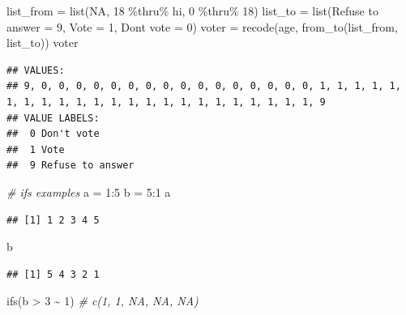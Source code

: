 \documentclass[
]{book}
\newenvironment{Shaded}{\begin{snugshade}}{\end{snugshade}}
\newcommand{\AttributeTok}[1]{\textcolor[rgb]{0.77,0.63,0.00}{#1}}
\newcommand{\CommentTok}[1]{\textcolor[rgb]{0.56,0.35,0.01}{\textit{#1}}}
\newcommand{\ConstantTok}[1]{\textcolor[rgb]{0.00,0.00,0.00}{#1}}
\newcommand{\DecValTok}[1]{\textcolor[rgb]{0.00,0.00,0.81}{#1}}
\newcommand{\FunctionTok}[1]{\textcolor[rgb]{0.00,0.00,0.00}{#1}}
\newcommand{\NormalTok}[1]{#1}
\newcommand{\OtherTok}[1]{\textcolor[rgb]{0.56,0.35,0.01}{#1}}
\newcommand{\SpecialCharTok}[1]{\textcolor[rgb]{0.00,0.00,0.00}{#1}}
\newcommand{\StringTok}[1]{\textcolor[rgb]{0.31,0.60,0.02}{#1}}
\begin{document}
\begin{Shaded}
\begin{Highlighting}[]
\NormalTok{list\_from }\OtherTok{=} \FunctionTok{list}\NormalTok{(}\ConstantTok{NA}\NormalTok{, }\DecValTok{18} \SpecialCharTok{\%thru\%}\NormalTok{ hi, }\DecValTok{0} \SpecialCharTok{\%thru\%} \DecValTok{18}\NormalTok{)}
\NormalTok{list\_to }\OtherTok{=} \FunctionTok{list}\NormalTok{(}\StringTok{\textasciigrave{}}\AttributeTok{Refuse to answer}\StringTok{\textasciigrave{}} \OtherTok{=} \DecValTok{9}\NormalTok{, }\AttributeTok{Vote =} \DecValTok{1}\NormalTok{, }\StringTok{\textasciigrave{}}\AttributeTok{Don\textquotesingle{}t vote}\StringTok{\textasciigrave{}} \OtherTok{=} \DecValTok{0}\NormalTok{)}
\NormalTok{voter }\OtherTok{=} \FunctionTok{recode}\NormalTok{(age, }\FunctionTok{from\_to}\NormalTok{(list\_from, list\_to))}
\NormalTok{voter}
\end{Highlighting}
\end{Shaded}

\begin{verbatim}
## VALUES:
## 9, 0, 0, 0, 0, 0, 0, 0, 0, 0, 0, 0, 0, 0, 0, 0, 0, 1, 1, 1, 1, 1, 1, 1, 1, 1, 1, 1, 1, 1, 1, 1, 1, 1, 1, 1, 1, 1, 1, 1, 9
## VALUE LABELS:                   
##  0 Don't vote      
##  1 Vote            
##  9 Refuse to answer
\end{verbatim}

\begin{Shaded}
\begin{Highlighting}[]
\CommentTok{\# \textquotesingle{}ifs\textquotesingle{} examples}
\NormalTok{a }\OtherTok{=} \DecValTok{1}\SpecialCharTok{:}\DecValTok{5}
\NormalTok{b }\OtherTok{=} \DecValTok{5}\SpecialCharTok{:}\DecValTok{1}
\NormalTok{a}
\end{Highlighting}
\end{Shaded}

\begin{verbatim}
## [1] 1 2 3 4 5
\end{verbatim}

\begin{Shaded}
\begin{Highlighting}[]
\NormalTok{b}
\end{Highlighting}
\end{Shaded}

\begin{verbatim}
## [1] 5 4 3 2 1
\end{verbatim}

\begin{Shaded}
\begin{Highlighting}[]
\FunctionTok{ifs}\NormalTok{(b }\SpecialCharTok{\textgreater{}} \DecValTok{3} \SpecialCharTok{\textasciitilde{}} \DecValTok{1}\NormalTok{)  }\CommentTok{\# c(1, 1, NA, NA, NA)}
\end{Highlighting}
\end{Shaded}
\end{document}
